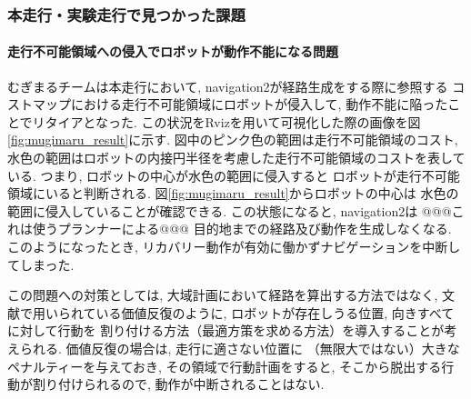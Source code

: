 \subsubsection{本走行・実験走行で見つかった課題}
\paragraph{走行不可能領域への侵入でロボットが動作不能になる問題}
むぎまるチームは本走行において, navigation2が経路生成をする際に参照する
コストマップにおける走行不可能領域にロボットが侵入して, 
動作不能に陥ったことでリタイアとなった. 
この状況をRvizを用いて可視化した際の画像を図\ref{fig:mugimaru_result}に示す. 
図中のピンク色の範囲は走行不可能領域のコスト, 
水色の範囲はロボットの内接円半径を考慮した走行不可能領域のコストを表している. 
つまり, ロボットの中心が水色の範囲に侵入すると
ロボットが走行不可能領域にいると判断される. 
図\ref{fig:mugimaru_result}からロボットの中心は
水色の範囲に侵入していることが確認できる. 
この状態になると, navigation2は
@@@これは使うプランナーによる@@@
目的地までの経路及び動作を生成しなくなる. 
このようになったとき, 
リカバリー動作が有効に働かずナビゲーションを中断してしまった. 

この問題への対策としては, 
大域計画において経路を算出する方法ではなく, 
文献\cite{ueda2023JRM}で用いられている価値反復のように, 
ロボットが存在しうる位置, 向きすべてに対して行動を
割り付ける方法（最適方策を求める方法）を導入することが考えられる. 
価値反復の場合は, 走行に適さない位置に
（無限大ではない）大きなペナルティーを与えておき, 
その領域で行動計画をすると, 
そこから脱出する行動が割り付けられるので, 
動作が中断されることはない. 




